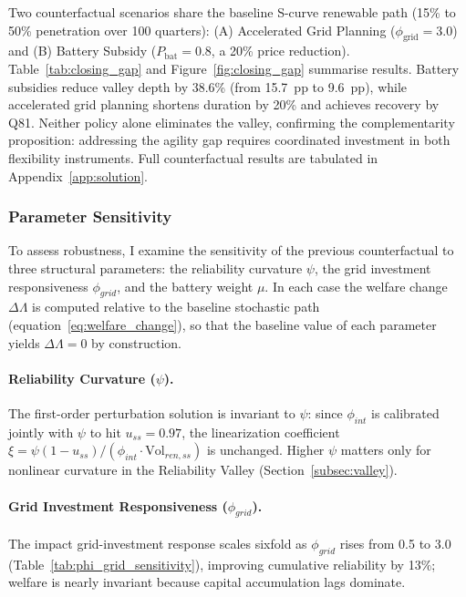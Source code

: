 	Two counterfactual scenarios share the baseline S-curve renewable path (15\% to 50\% penetration over 100 quarters): (A) Accelerated Grid Planning ($\phi_{\text{grid}}=3.0$) and (B) Battery Subsidy ($P_{\text{bat}}=0.8$, a 20\% price reduction). Table~\ref{tab:closing_gap} and Figure~\ref{fig:closing_gap} summarise results. Battery subsidies reduce valley depth by 38.6\% (from 15.7~pp to 9.6~pp), while accelerated grid planning shortens duration by 20\% and achieves recovery by Q81. Neither policy alone eliminates the valley, confirming the complementarity proposition: addressing the agility gap requires coordinated investment in both flexibility instruments. Full counterfactual results are tabulated in Appendix~\ref{app:solution}.

	\subsubsection{Parameter Sensitivity}

	To assess robustness, I examine the sensitivity of the previous counterfactual to three structural parameters: the reliability curvature $\psi$, the grid investment responsiveness $\phi_{grid}$, and the battery weight $\mu$. In each case the welfare change $\Delta\Lambda$ is computed relative to the baseline stochastic path (equation~\ref{eq:welfare_change}), so that the baseline value of each parameter yields $\Delta\Lambda = 0$ by construction.

	\paragraph{Reliability Curvature ($\psi$).} The first-order perturbation solution is invariant to $\psi$: since $\phi_{int}$ is calibrated jointly with $\psi$ to hit $u_{ss}=0.97$, the linearization coefficient $\xi = \psi(1-u_{ss})/(\phi_{int}\cdot\text{Vol}_{ren,ss})$ is unchanged. Higher $\psi$ matters only for nonlinear curvature in the Reliability Valley (Section~\ref{subsec:valley}).

	\paragraph{Grid Investment Responsiveness ($\phi_{grid}$).} The impact grid-investment response scales sixfold as $\phi_{grid}$ rises from 0.5 to 3.0 (Table~\ref{tab:phi_grid_sensitivity}), improving cumulative reliability by 13\%; welfare is nearly invariant because capital accumulation lags dominate.

